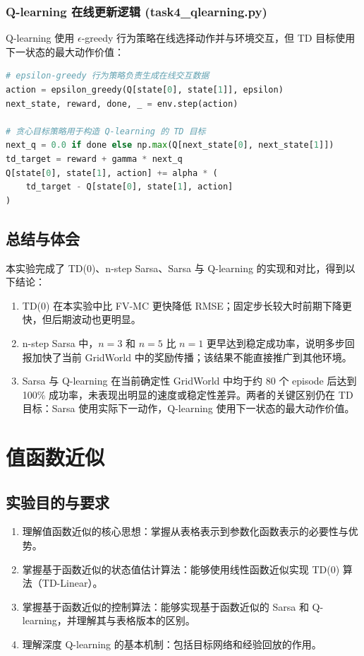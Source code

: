 \documentclass[11pt,a4paper,UTF8]{ctexart}
\numberwithin{figure}{section}
\numberwithin{table}{section}
\begin{document}
\subsubsection{Q-learning 在线更新逻辑 (task4\_qlearning.py)}
Q-learning 使用 $\epsilon$-greedy 行为策略在线选择动作并与环境交互，但 TD 目标使用下一状态的最大动作价值：
\begin{lstlisting}[language=python]
# epsilon-greedy 行为策略负责生成在线交互数据
action = epsilon_greedy(Q[state[0], state[1]], epsilon)
next_state, reward, done, _ = env.step(action)

# 贪心目标策略用于构造 Q-learning 的 TD 目标
next_q = 0.0 if done else np.max(Q[next_state[0], next_state[1]])
td_target = reward + gamma * next_q
Q[state[0], state[1], action] += alpha * (
    td_target - Q[state[0], state[1], action]
)
\end{lstlisting}
\subsection{总结与体会}

本实验完成了 TD(0)、n-step Sarsa、Sarsa 与 Q-learning 的实现和对比，得到以下结论：
\begin{enumerate}
\item TD(0) 在本实验中比 FV-MC 更快降低 RMSE；固定步长较大时前期下降更快，但后期波动也更明显。
\item n-step Sarsa 中，$n=3$ 和 $n=5$ 比 $n=1$ 更早达到稳定成功率，说明多步回报加快了当前 GridWorld 中的奖励传播；该结果不能直接推广到其他环境。
\item Sarsa 与 Q-learning 在当前确定性 GridWorld 中均于约 80 个 episode 后达到 100\% 成功率，未表现出明显的速度或稳定性差异。两者的关键区别仍在 TD 目标：Sarsa 使用实际下一动作，Q-learning 使用下一状态的最大动作价值。
\end{enumerate}

\newpage
\section{值函数近似}

\subsection{实验目的与要求}
\begin{enumerate}
\item 理解值函数近似的核心思想：掌握从表格表示到参数化函数表示的必要性与优势。
\item 掌握基于函数近似的状态值估计算法：能够使用线性函数近似实现 TD(0) 算法（TD-Linear）。
\item 掌握基于函数近似的控制算法：能够实现基于函数近似的 Sarsa 和 Q-learning，并理解其与表格版本的区别。
\item 理解深度 Q-learning 的基本机制：包括目标网络和经验回放的作用。
\end{enumerate}
\end{document}
